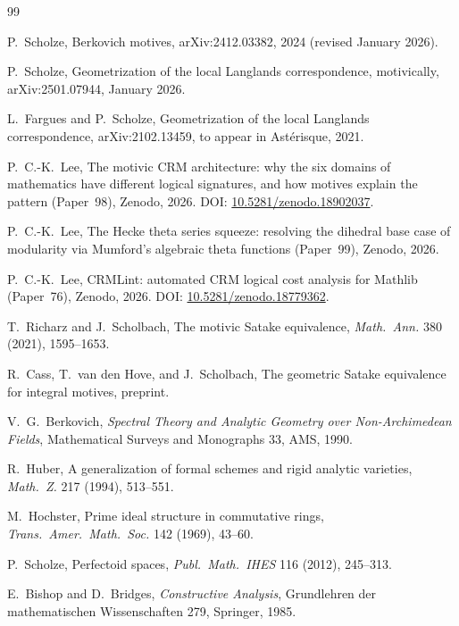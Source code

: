 \documentclass[11pt,a4paper]{article}
\theoremstyle{plain}
\theoremstyle{definition}
\begin{document}
\begin{thebibliography}{99}

 P.\ Scholze, Berkovich motives, arXiv:2412.03382, 2024 (revised January 2026).

 P.\ Scholze, Geometrization of the local Langlands correspondence, motivically, arXiv:2501.07944, January 2026.

 L.\ Fargues and P.\ Scholze, Geometrization of the local Langlands correspondence, arXiv:2102.13459, to appear in Ast\'erisque, 2021.

 P.\ C.-K.\ Lee, The motivic CRM architecture: why the six domains of mathematics have different logical signatures, and how motives explain the pattern (Paper~98), Zenodo, 2026. DOI: \href{https://doi.org/10.5281/zenodo.18902037}{10.5281/zenodo.18902037}.

 P.\ C.-K.\ Lee, The Hecke theta series squeeze: resolving the dihedral base case of modularity via Mumford's algebraic theta functions (Paper~99), Zenodo, 2026.

 P.\ C.-K.\ Lee, CRMLint: automated CRM logical cost analysis for Mathlib (Paper~76), Zenodo, 2026. DOI: \href{https://doi.org/10.5281/zenodo.18779362}{10.5281/zenodo.18779362}.

 T.\ Richarz and J.\ Scholbach, The motivic Satake equivalence, \emph{Math.\ Ann.} 380 (2021), 1595--1653.

 R.\ Cass, T.\ van den Hove, and J.\ Scholbach, The geometric Satake equivalence for integral motives, preprint.

 V.\ G.\ Berkovich, \emph{Spectral Theory and Analytic Geometry over Non-Archimedean Fields}, Mathematical Surveys and Monographs 33, AMS, 1990.

 R.\ Huber, A generalization of formal schemes and rigid analytic varieties, \emph{Math.\ Z.} 217 (1994), 513--551.

 M.\ Hochster, Prime ideal structure in commutative rings, \emph{Trans.\ Amer.\ Math.\ Soc.} 142 (1969), 43--60.

 P.\ Scholze, Perfectoid spaces, \emph{Publ.\ Math.\ IHES} 116 (2012), 245--313.

 E.\ Bishop and D.\ Bridges, \emph{Constructive Analysis}, Grundlehren der mathematischen Wissenschaften 279, Springer, 1985.


\end{thebibliography}
\end{document}
